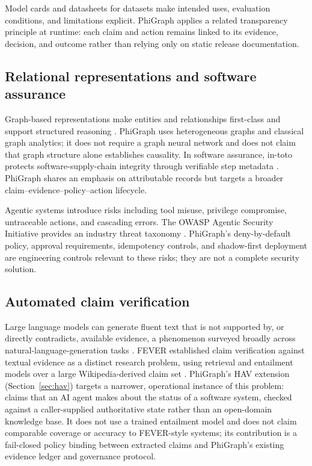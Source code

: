 \documentclass[11pt]{article}
\begin{document}
Model cards \cite{mitchell2019modelcards} and datasheets for datasets
\cite{gebru2021datasheets} make intended uses, evaluation conditions, and
limitations explicit. PhiGraph applies a related transparency principle at
runtime: each claim and action remains linked to its evidence, decision, and
outcome rather than relying only on static release documentation.

\subsection{Relational representations and software assurance}

Graph-based representations make entities and relationships first-class and
support structured reasoning \cite{battaglia2018relational}. PhiGraph uses
heterogeneous graphs and classical graph analytics; it does not require a graph
neural network and does not claim that graph structure alone establishes
causality. In software assurance, in-toto protects software-supply-chain
integrity through verifiable step metadata \cite{torresarias2019intoto}.
PhiGraph shares an emphasis on attributable records but targets a broader
claim--evidence--policy--action lifecycle.

Agentic systems introduce risks including tool misuse, privilege compromise,
untraceable actions, and cascading errors. The OWASP Agentic Security
Initiative provides an industry threat taxonomy \cite{owasp2025agentic}.
PhiGraph's deny-by-default policy, approval requirements, idempotency controls,
and shadow-first deployment are engineering controls relevant to these risks;
they are not a complete security solution.

\subsection{Automated claim verification}

Large language models can generate fluent text that is not supported by, or
directly contradicts, available evidence, a phenomenon surveyed broadly across
natural-language-generation tasks \cite{ji2023hallucination}. FEVER established
claim verification against textual evidence as a distinct research problem,
using retrieval and entailment models over a large Wikipedia-derived claim set
\cite{thorne2018fever}. PhiGraph's HAV extension (Section~\ref{sec:hav})
targets a narrower, operational instance of this problem: claims that an
AI agent makes about the status of a software system, checked against a
caller-supplied authoritative state rather than an open-domain knowledge base.
It does not use a trained entailment model and does not claim comparable
coverage or accuracy to FEVER-style systems; its contribution is a fail-closed
policy binding between extracted claims and PhiGraph's existing evidence
ledger and governance protocol.
\end{document}
